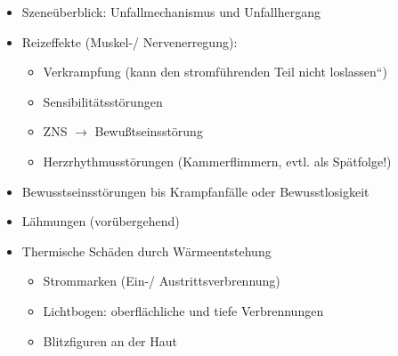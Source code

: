 \TextSlide{\TxSymptome}
{%
\begin{itemize}
  \item Szeneüberblick: Unfallmechanismus und Unfallhergang
  \item Reizeffekte (Muskel-/ Nervenerregung):
  \begin{itemize}
    \item Verkrampfung ({\quotedblbase}kann den stromführenden Teil nicht
    loslassen{\textquotedblleft})
    \item Sensibilitätsstörungen
    \item ZNS ${\rightarrow}$ Bewußtseinsstörung
    \item Herzrhythmusstörungen (Kammerflimmern, evtl.  als Spätfolge!)
  \end{itemize}
  \item Bewusstseinsstörungen bis Krampfanfälle oder Bewusstlosigkeit
  \item Lähmungen (vorübergehend)
  \item Thermische Schäden durch Wärmeentstehung
  \begin{itemize}
    \item Strommarken (Ein-/ Austrittsverbrennung)
    \item Lichtbogen: oberflächliche und tiefe  Verbrennungen
    \item Blitzfiguren an der Haut
  \end{itemize}
\end{itemize}



}
